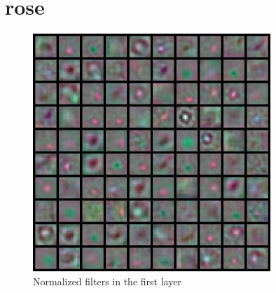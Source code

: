 \documentclass[11pt, oneside]{article}   	%
\begin{document}
\section{rose}
\begin{figure}[H]
	\centering
	\includegraphics[width=0.8\textwidth]{rose}
	\caption{Normalized filters in the first layer}
	\label {fig:rosef}
\end{figure}
\end{document}
